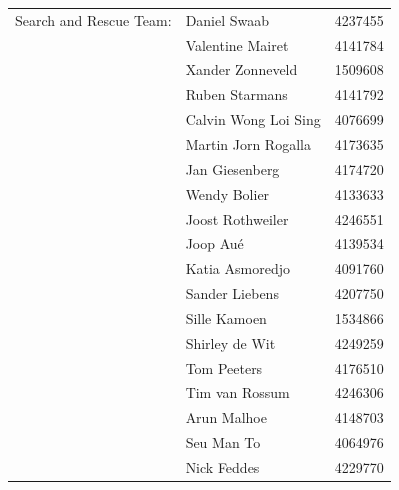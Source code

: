 \begin{titlepage}
\begin{center}
\begin{tabular}{lll}
    Search and Rescue Team: & Daniel Swaab & 4237455\\
        & Valentine Mairet     & 4141784\\
        & Xander Zonneveld     & 1509608\\
        & Ruben Starmans       & 4141792\\
        & Calvin Wong Loi Sing & 4076699\\
        & Martin Jorn Rogalla  & 4173635\\
        & Jan Giesenberg       & 4174720\\
        & Wendy Bolier         & 4133633\\
        & Joost Rothweiler    & 4246551\\
        & Joop Aué             & 4139534\\
        & Katia Asmoredjo      & 4091760\\
        & Sander Liebens       & 4207750\\
        & Sille Kamoen         & 1534866\\
        & Shirley de Wit       & 4249259\\
        & Tom Peeters          & 4176510\\
        & Tim van Rossum       & 4246306\\
        & Arun Malhoe          & 4148703\\
        & Seu Man To           & 4064976\\
        & Nick Feddes          & 4229770
\end{tabular}

\bigskip
\bigskip

\bigskip
\bigskip

\end{center}

\end{titlepage}
